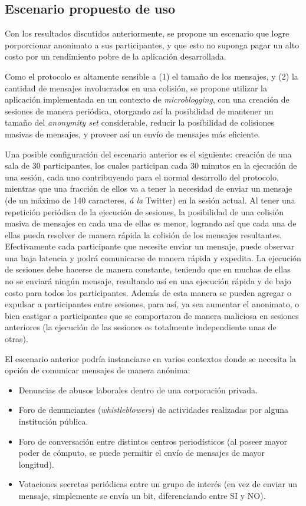 \subsection{Escenario propuesto de uso}

Con los resultados discutidos anteriormente, se propone un escenario que logre 
porporcionar anonimato a sus participantes, y que esto no suponga pagar un 
alto costo por un rendimiento pobre de la aplicación desarrollada.

Como el protocolo es altamente sensible a (1) el tamaño de los mensajes, y (2) 
la cantidad de mensajes involucrados en una colisión, se propone utilizar la 
aplicación implementada en un contexto de \emph{microblogging}, con una 
creación de sesiones de manera periódica, otorgando así la posibilidad de 
mantener un tamaño del \emph{anonymity set} considerable, reducir la 
posibilidad de colisiones masivas de mensajes, y proveer así un envío de 
mensajes más eficiente.

Una posible configuración del escenario anterior es el siguiente: creación de 
una sala de 30 participantes, los cuales participan cada 30 minutos en la 
ejecución de una sesión, cada uno contribuyendo para el normal desarrollo del 
protocolo, mientras que una fracción de ellos va a tener la necesidad de 
enviar un mensaje (de un máximo de 140 caracteres, \emph{á la} Twitter) en la 
sesión actual. Al tener una repetición periódica de la ejecución de sesiones, 
la posibilidad de una colisión masiva de mensajes en cada una de ellas es 
menor, logrando así que cada una de ellas pueda resolver de manera rápida la 
colisión de los mensajes resultantes. Efectivamente cada participante que 
necesite enviar un mensaje, puede observar una baja latencia y podrá 
comunicarse de manera rápida y expedita. La ejecución de sesiones 
debe hacerse de manera constante, teniendo que en muchas de ellas no se 
enviará ningún mensaje, resultando así en una ejecución rápida y de bajo costo 
para todos los participantes. Además de esta manera se pueden agregar o 
expulsar a participantes entre sesiones, para así, ya sea aumentar el 
anonimato, o bien castigar a participantes que se comportaron de manera 
maliciosa en sesiones anteriores (la ejecución de las sesiones es totalmente 
independiente unas de otras).

El escenario anterior podría instanciarse en varios contextos donde se 
necesita la opción de comunicar mensajes de manera anónima:
\begin{itemize}
	\item Denuncias de abusos laborales dentro de una corporación privada.
	\item Foro de denunciantes (\emph{whistleblowers}) de actividades 
	realizadas por alguna institución pública.
	\item Foro de conversación entre distintos centros periodísticos (al 
	poseer mayor poder de cómputo, se puede permitir el envío de mensajes de 
	mayor longitud).
	\item Votaciones secretas periódicas entre un grupo de interés (en vez de 
	enviar un mensaje, 
	simplemente se envía un bit, diferenciando entre SI y NO).
\end{itemize} 